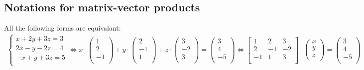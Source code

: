 \documentclass[11pt, a4paper]{article}
\begin{document}
\subsection{Notations for matrix-vector products}
All the following forms are equivalant: 
\begin{align*}
  \begin{cases}
    x + 2y + 3z =3\\
    2x - y -2z = 4\\
    -x + y + 3z = 5\\
  \end{cases}
  \Leftrightarrow
  x \cdot \begin{pmatrix} 1\\ 2\\ -1\\ \end{pmatrix} +
    y \cdot \begin{pmatrix} 2\\ -1\\ 1\\ \end{pmatrix} +
    z \cdot \begin{pmatrix} 3\\ -2\\ 3\\ \end{pmatrix} =
    \begin{pmatrix} 3\\ 4\\ -5\\ \end{pmatrix}
  \Leftrightarrow
  \begin{bmatrix}
    1 & 2 & 3\\
    2 & -1 & -2\\
    -1 & 1 & 3\\
  \end{bmatrix}
  \cdot
  \begin{pmatrix} x\\ y\\ z\\ \end{pmatrix}
  =
  \begin{pmatrix} 3\\ 4\\ -5\\ \end{pmatrix}
\end{align*}
\end{document}
